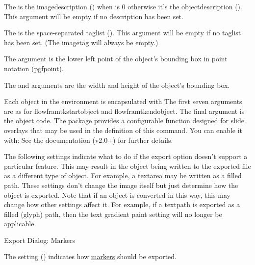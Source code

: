 The  is the \gls{imagedescription}
() when  is 0 otherwise
it's the \gls{objectdescription}
(). This argument will be empty if
no description has been set.

The  is the space-separated \gls{taglist} ().
This argument will be empty if no \gls{taglist} has been set.
(The \gls{imagetag} will always be empty.)

The  argument is the lower left point of the object's bounding
box in  point notation (\gls{pgfpoint}).

The  and  arguments are the width and
height of the object's bounding box.


Each object in the  environment is encapsulated with
The first seven arguments are as for \gls{flowframtkstartobject}
and \gls{flowframtkendobject}. The final argument is the object
code. The  package provides a configurable function
designed for slide overlays that
may be used in the definition of this command. You can enable it
with:
See the  documentation (v2.0+) for further details.

\begin{information}
The following settings indicate what to do if the export option
doesn't support a particular feature. This may result in the
\gls{object} being written to the exported file as a different type
of object. For example, a \gls{textarea} may be written as a filled
path. These settings don't change the image itself but just
determine how the object is exported. Note that if an object is
converted in this way, this may change how other settings affect it.
For example, if a \gls{textpath} is exported as a filled (glyph) path, then
the text gradient paint setting will no longer be applicable.
\end{information}


 {}
 {Export Dialog: Markers}

The  setting () indicates how
\hyperref[sec:markers]{markers} should be exported.

